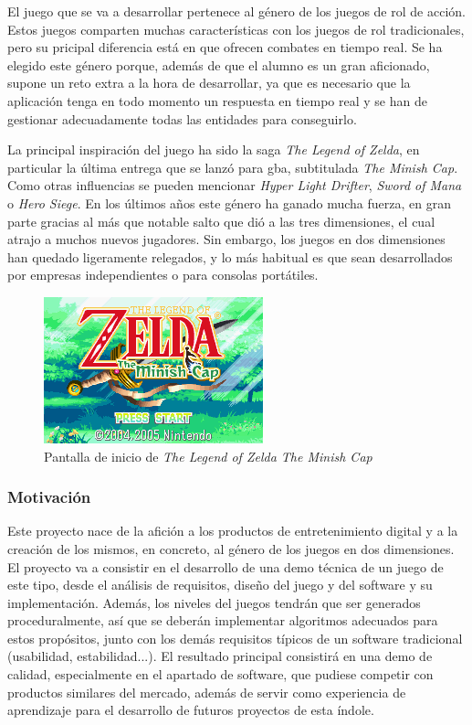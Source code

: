 			El juego que se va a desarrollar pertenece al género de los juegos de rol de acción. Estos juegos comparten muchas características con los juegos de rol tradicionales, pero su pricipal diferencia está en que ofrecen combates en tiempo real. Se ha elegido este género porque, además de que el alumno es un gran aficionado, supone un reto extra a la hora de desarrollar, ya que es necesario que la aplicación tenga en todo momento un respuesta en tiempo real y se han de gestionar adecuadamente todas las entidades para conseguirlo.

			La principal inspiración del juego ha sido la saga \textit{The Legend of Zelda}, en particular la última entrega que se lanzó para \acrshort{gba}, subtitulada \textit{The Minish Cap}. Como otras influencias se pueden mencionar \textit{Hyper Light Drifter}, \textit{Sword of Mana} o \textit{Hero Siege}. En los últimos años este género ha ganado mucha fuerza, en gran parte gracias al más que notable salto que dió a las tres dimensiones, el cual atrajo a muchos nuevos jugadores. Sin embargo, los juegos en dos dimensiones han quedado ligeramente relegados, y lo más habitual es que sean desarrollados por empresas independientes o para consolas portátiles.

			\begin{figure}[!htp]
				 \centering
				 \includegraphics{fig/zelda}
				 \caption{Pantalla de inicio de \textit{The Legend of Zelda The Minish Cap}}
				 \label{fig:zelda}
			\end{figure}

			\FloatBarrier

		\subsubsection{Motivación}

			Este proyecto nace de la afición a los productos de entretenimiento digital y a la creación de los mismos, en concreto, al género de los juegos en dos dimensiones. El proyecto va a consistir en el desarrollo de una demo técnica de un juego de este tipo, desde el análisis de requisitos, diseño del juego y del software y su implementación. Además, los niveles del juegos tendrán que ser generados proceduralmente, así que se deberán implementar algoritmos adecuados para estos propósitos, junto con los demás requisitos típicos de un software tradicional (usabilidad, estabilidad...). El resultado principal consistirá en una demo de calidad, especialmente en el apartado de software, que pudiese competir con productos similares del mercado, además de servir como experiencia de aprendizaje para el desarrollo de futuros proyectos de esta índole.
